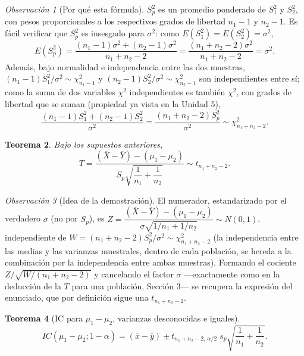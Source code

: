 \documentclass[11pt,a4paper]{article}
\theoremstyle{plain}
\newtheorem{teorema}{Teorema}[section]
\theoremstyle{definition}
\theoremstyle{remark}
\newtheorem{observacion}[teorema]{Observación}
\begin{document}
\begin{observacion}[Por qué esta fórmula]
$S_p^2$ es un promedio ponderado de $S_1^2$ y $S_2^2$, con pesos proporcionales a los respectivos grados de libertad $n_1-1$ y $n_2-1$. Es fácil verificar que $S_p^2$ es insesgado para $\sigma^2$: como $E(S_1^2)=E(S_2^2)=\sigma^2$,
\[
E(S_p^2) = \frac{(n_1-1)\sigma^2+(n_2-1)\sigma^2}{n_1+n_2-2} = \frac{(n_1+n_2-2)\sigma^2}{n_1+n_2-2} = \sigma^2.
\]
Además, bajo normalidad e independencia entre las dos muestras, $(n_1-1)S_1^2/\sigma^2\sim\chi^2_{n_1-1}$ y $(n_2-1)S_2^2/\sigma^2\sim\chi^2_{n_2-1}$ son independientes entre sí; como la suma de dos variables $\chi^2$ independientes es también $\chi^2$, con grados de libertad que se suman (propiedad ya vista en la Unidad 5),
\[
\frac{(n_1-1)S_1^2+(n_2-1)S_2^2}{\sigma^2} = \frac{(n_1+n_2-2)S_p^2}{\sigma^2} \sim \chi^2_{n_1+n_2-2}.
\]
\end{observacion}

\begin{teorema}
Bajo los supuestos anteriores,
\[
T = \frac{(\overline X-\overline Y)-(\mu_1-\mu_2)}{S_p\sqrt{\dfrac1{n_1}+\dfrac1{n_2}}} \sim t_{n_1+n_2-2}.
\]
\end{teorema}

\begin{observacion}[Idea de la demostración]
El numerador, estandarizado por el verdadero $\sigma$ (no por $S_p$), es $Z=\dfrac{(\overline X-\overline Y)-(\mu_1-\mu_2)}{\sigma\sqrt{1/n_1+1/n_2}}\sim N(0,1)$, independiente de $W=(n_1+n_2-2)S_p^2/\sigma^2\sim\chi^2_{n_1+n_2-2}$ (la independencia entre las medias y las varianzas muestrales, dentro de cada población, se hereda a la combinación por la independencia entre ambas muestras). Formando el cociente $Z/\sqrt{W/(n_1+n_2-2)}$ y cancelando el factor $\sigma$ —exactamente como en la deducción de la $T$ para una población, Sección 3— se recupera la expresión del enunciado, que por definición sigue una $t_{n_1+n_2-2}$.
\end{observacion}

\begin{teorema}[IC para $\mu_1-\mu_2$, varianzas desconocidas e iguales]
\[
IC(\mu_1-\mu_2;1-\alpha) = (\overline x-\overline y) \pm t_{n_1+n_2-2,\,\alpha/2}\; s_p\sqrt{\frac{1}{n_1}+\frac{1}{n_2}}.
\]
\end{teorema}
\end{document}
